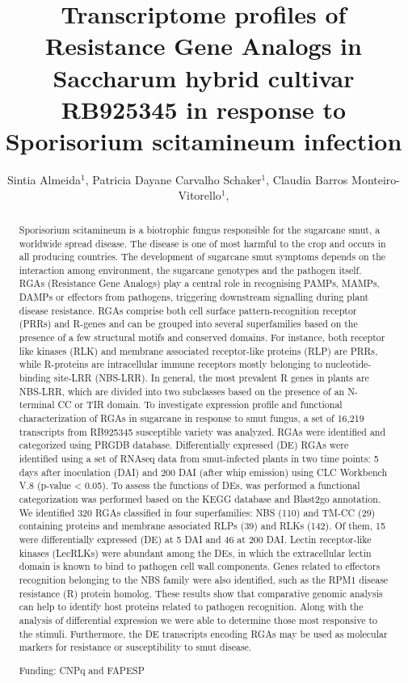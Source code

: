 \documentclass[twoside]{article}
\title{\vspace{-15mm}\fontsize{24pt}{10pt}\selectfont\textbf{ Transcriptome profiles of Resistance Gene Analogs in Saccharum hybrid cultivar RB925345 in response to Sporisorium scitamineum infection }} %
\author{ Sintia Almeida$^{1}$, Patricia Dayane Carvalho Schaker$^{1}$, Claudia Barros Monteiro-Vitorello$^{1}$, }
\affil{ 1 University of São Paulo

 }
\date{}
\begin{document}
  
  
  \maketitle %
  
  
  \thispagestyle{fancy} %
  
  
  \begin{abstract}
  Sporisorium scitamineum is a biotrophic fungus responsible for the sugarcane smut, a worldwide spread disease. The disease is one of most harmful to the crop and occurs in all producing countries. The development of sugarcane smut symptoms depends on the interaction among environment, the sugarcane genotypes and the pathogen itself. RGAs (Resistance Gene Analogs) play a central role in recognising PAMPs, MAMPs, DAMPs or effectors from pathogens, triggering downstream signalling during plant disease resistance. RGAs comprise both cell surface pattern-recognition receptor (PRRs) and R-genes and can be grouped into several superfamilies based on the presence of a few structural motifs and conserved domains. For instance, both receptor like kinases (RLK) and membrane associated receptor-like proteins (RLP) are PRRs, while R-proteins are intracellular immune receptors mostly belonging to nucleotide-binding site-LRR (NBS-LRR). In general, the most prevalent R genes in plants are NBS-LRR, which are divided into two subclasses based on the presence of an N-terminal CC or TIR domain. 
To investigate expression profile and functional characterization of RGAs in sugarcane in response to smut fungus, a set of 16,219 transcripts from RB925345 susceptible variety was analyzed. RGAs were identified and categorized using PRGDB database. Differentially expressed (DE) RGAs were identified using a set of RNAseq data from smut-infected plants in two time points: 5 days after inoculation (DAI) and 200 DAI (after whip emission) using CLC Workbench V.8 (p-value < 0.05). To assess the functions of DEs, was performed a functional categorization was performed based on the KEGG database and Blast2go annotation.
We identified 320 RGAs classified in four superfamilies: NBS (110) and TM-CC (29) containing proteins and membrane associated RLPs (39) and RLKs (142). Of them, 15 were differentially expressed (DE) at 5 DAI and 46 at 200 DAI. Lectin receptor-like kinases (LecRLKs) were abundant among the DEs, in which the extracellular lectin domain   is known to bind to pathogen cell wall components. Genes related to effectors recognition belonging to the NBS family were also identified, such as the RPM1 disease resistance (R) protein homolog. 
These results show that comparative genomic analysis can help to identify host proteins related to pathogen recognition. Along with the analysis of differential expression we were able to determine those most responsive to the stimuli. 
Furthermore, the DE transcripts encoding RGAs may be used as molecular markers for resistance or susceptibility to smut disease.
  
  Funding: CNPq and FAPESP \\ 
  \end{abstract}
  
\end{document}

